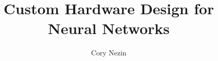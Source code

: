 \documentclass[12pt]{article}
\begin{document}
\title{Custom Hardware Design for Neural Networks}
\author{Cory Nezin}
\maketitle



{}
\end{document}
